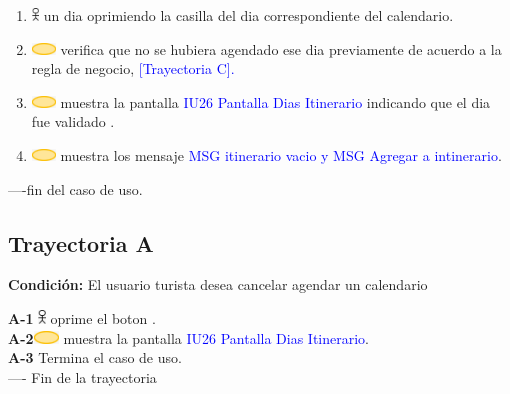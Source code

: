 \begin{enumerate}
\item \includegraphics[width=0.0150\textwidth]{Figuras/persona.png} un dia oprimiendo la casilla  del dia correspondiente del calendario.

\item \includegraphics[width=0.0500\textwidth]{Figuras/sistema.png} verifica que no se hubiera agendado ese dia previamente de acuerdo a la regla de negocio, \textcolor{blue}{[Trayectoria C].}

\item \includegraphics[width=0.0500\textwidth]{Figuras/sistema.png} muestra la pantalla \textcolor{blue}{IU26 Pantalla Dias Itinerario} indicando que el dia fue validado .

\item \includegraphics[width=0.0500\textwidth]{Figuras/sistema.png} muestra los mensaje \textcolor{blue}{MSG itinerario vacio y MSG Agregar a intinerario}.

\end{enumerate}
----fin del caso de uso. \\

\subsection{\textbf{Trayectoria A}}

\textbf{Condición:} El usuario turista desea cancelar agendar un calendario \par

     \textbf{A-1} \includegraphics[width=0.0150\textwidth]{Figuras/persona.png} oprime el boton . \\
    \textbf{A-2}\includegraphics[width=0.0500\textwidth]{Figuras/sistema.png} muestra la pantalla \textcolor{blue}{IU26 Pantalla Dias Itinerario}. \\
   \textbf{A-3} Termina el caso de uso. \\
   ---- Fin de la trayectoria\par


